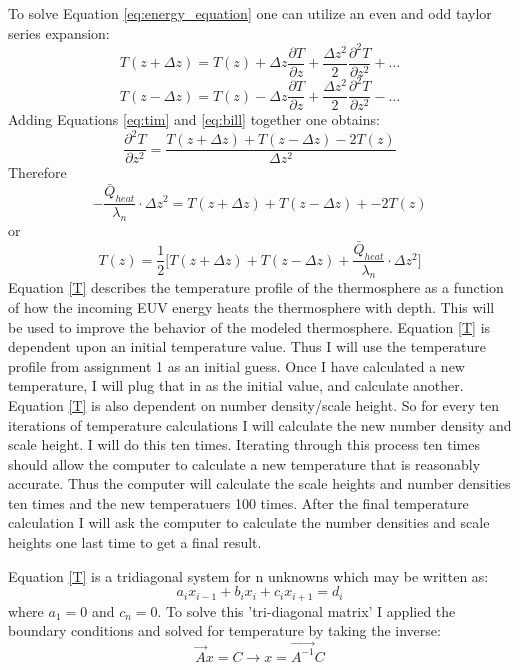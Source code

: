 \documentclass[10pt]{article}
\begin{document}
\begin{multicols}{2}
To solve Equation \eqref{eq:energy_equation} one can utilize an even and odd taylor series expansion:
\begin{equation} \label{eq:tim}
T(z + \Delta z) = T(z) + \Delta z \frac{\partial T}{\partial z} + \frac{\Delta z^2}{2}\frac{\partial ^2 T}{\partial z^2} + ...
\end{equation}
\begin{equation} \label{eq:bill}
T(z - \Delta z) = T(z) - \Delta z \frac{\partial T}{\partial z} + \frac{\Delta z^2}{2}\frac{\partial ^2 T}{\partial z^2} - ...
\end{equation}
\noindent Adding Equations \eqref{eq:tim} and \eqref{eq:bill} together one obtains:
\begin{equation} \label{whatever_1}
\frac{\partial ^2 T}{\partial z^2} = \frac{T(z + \Delta z) + T(z - \Delta z) - 2T(z)}{\Delta z^2}
\end{equation}
Therefore
\begin{equation} \label{whatever_2}
-\frac{\bar Q_{heat}}{\lambda_n} \cdot \Delta z^2 = T(z + \Delta z) + T(z - \Delta z) + - 2T(z)
\end{equation}
or
\begin{equation} \label{T}
T(z) = \frac{1}{2} \bigg[T(z + \Delta z) + T(z - \Delta z) + \frac{\bar Q_{heat}}{\lambda_n} \cdot \Delta z^2 \bigg]
\end{equation}
Equation \eqref{T} describes the temperature profile of the thermosphere as a function of how the incoming EUV energy heats the thermosphere with depth. This will be used to improve the behavior of the modeled thermosphere. Equation \eqref{T} is dependent upon an initial temperature value. Thus I will use the temperature profile from assignment 1 as an initial guess. Once I have calculated a new temperature, I will plug that in as the initial value, and calculate another. Equation \eqref{T} is also dependent on number density/scale height. So for every ten iterations of temperature calculations I will calculate the new number density and scale height. I will do this ten times. Iterating through this process ten times should allow the computer to calculate a new temperature that is reasonably accurate. Thus the computer will calculate the scale heights and number densities ten times and the new temperatuers 100 times. After the final temperature calculation I will ask the computer to calculate the number densities and scale heights one last time to get a final result.

Equation \eqref{T} is a tridiagonal system for n unknowns which may be written as:
\begin{equation}
a_ix_{i-1} + b_ix_{i} + c_ix_{i+1} = d_i
\end{equation}
where $a_1 = 0$ and $c_n = 0$. To solve this 'tri-diagonal matrix' I applied the boundary conditions and solved for temperature by taking the inverse:
\begin{equation}
\overrightarrow{A}x = C \rightarrow x = \overrightarrow{A^{-1}}C
\end{equation}



\end{multicols}
\end{document}
